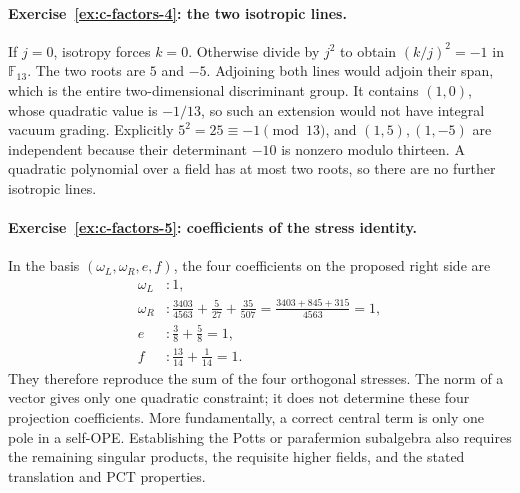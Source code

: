 \paragraph{Exercise~\ref{ex:c-factors-4}: the two isotropic lines.}
\label{sol:ex:c-factors-4}
If $j=0$, isotropy forces $k=0$. Otherwise divide by $j^2$ to
obtain $(k/j)^2=-1$ in $\mathbb F_{13}$. The two roots are
$5$ and $-5$. Adjoining both lines would adjoin their span, which
is the entire two-dimensional discriminant group. It contains
$(1,0)$, whose quadratic value is $-1/13$, so such an extension
would not have integral vacuum grading.
Explicitly $5^2=25\equiv-1\pmod{13}$, and
$(1,5),(1,-5)$ are independent because their determinant
$-10$ is nonzero modulo thirteen. A quadratic polynomial over a
field has at most two roots, so there are no further isotropic lines.



\paragraph{Exercise~\ref{ex:c-factors-5}: coefficients of the stress identity.}
\label{sol:ex:c-factors-5}
In the basis $(\omega_L,\omega_R,e,f)$, the four coefficients on
the proposed right side are
\begin{align*}
 \omega_L &: 1,\\
 \omega_R &: \frac{3403}{4563}+\frac5{27}+\frac{35}{507}
             =\frac{3403+845+315}{4563}=1,\\
 e &: \frac38+\frac58=1,\\
 f &: \frac{13}{14}+\frac1{14}=1.
\end{align*}
They therefore reproduce the sum of the four orthogonal stresses.
The norm of a vector gives only one quadratic constraint; it
does not determine these four projection coefficients. More
fundamentally, a correct central term is only one pole in a
self-OPE. Establishing the Potts or parafermion subalgebra also
requires the remaining singular products, the requisite higher
fields, and the stated translation and PCT properties.



